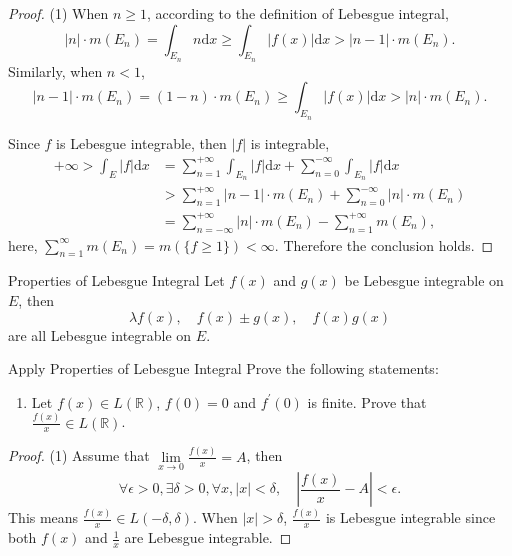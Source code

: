 \begin{proof}
  (1) When $n \geq 1$, according to the definition of Lebesgue integral,
  \begin{equation}
    |n| \cdot m(E_n) = \int_{E_n} n \mathrm{d} x \geq \int_{E_n} |f(x)| \mathrm{d}x
    > |n-1| \cdot m(E_n).
  \end{equation}
  Similarly, when $n < 1$,
  \begin{equation}
    |n - 1| \cdot m(E_n) = (1-n) \cdot m(E_n) \geq \int_{E_n} |f(x)|\mathrm{d}x
    > |n|\cdot m(E_n).
  \end{equation}

  Since $f$ is Lebesgue integrable, then $|f|$ is integrable,
  \begin{align}
    +\infty > \int_E |f|\mathrm{d} x
    &= \sum\limits_{n = 1}^{+\infty} \int_{E_n} |f|\mathrm{d}x + \sum\limits_{n = 0}^{-\infty} \int_{E_n}|f|\mathrm{d}x\\
    &> \sum\limits_{n = 1}^{+\infty} |n-1| \cdot m(E_n)
    + \sum\limits_{n = 0}^{-\infty} |n| \cdot m(E_n)\\
    &= \sum\limits_{n = -\infty}^{+\infty} |n| \cdot m(E_n) - \sum\limits_{n = 1}^{+\infty} m(E_n),
  \end{align}
  here, $\sum\limits_{n = 1}^{\infty} m(E_n) = m(\{f \geq 1\}) < \infty$.
  Therefore the conclusion holds.
\end{proof}

\begin{proposition}{Properties of Lebesgue Integral}{}
  Let $f(x)$ and $g(x)$ be Lebesgue integrable on $E$, then
  \begin{equation}
    \lambda f(x), \quad f(x) \pm g(x), \quad f(x)g(x)
  \end{equation}
  are all Lebesgue integrable on $E$.
\end{proposition}

\begin{example}{Apply Properties of Lebesgue Integral}{}
  Prove the following statements:
  \begin{enumerate}
  \item Let $f(x) \in L(\mathbb{R})$, $f(0) = 0$ and $f^{\prime}(0)$ is finite.
    Prove that $\frac{f(x)}{x} \in L(\mathbb{R})$.
  \end{enumerate}
\end{example}

\begin{proof}
  (1) Assume that $\lim \limits _{x \rightarrow 0} \frac{f(x)}{x} = A$,
  then
  \begin{equation}
    \forall \epsilon > 0, \exists \delta > 0, \forall x, |x| < \delta,
    \quad |\frac{f(x)}{x} - A| < \epsilon.
  \end{equation}
  This means $\frac{f(x)}{x} \in L(-\delta, \delta)$.
  When $|x| > \delta$, $\frac{f(x)}{x}$ is Lebesgue integrable since both $f(x)$ and $\frac{1}{x}$ are Lebesgue integrable.
\end{proof}

